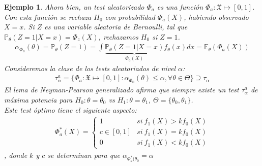 \documentclass[10pt]{article}
\theoremstyle{plain}
\newtheorem{ej}{Ejemplo}
\theoremstyle{definition}
\begin{document}
\begin{ej}
Ahora bien, un test aleatorizado $\Phi_{a}$ es una función $\Phi_{a} : \mathfrak{X} \mapsto [0,1]$. Con esta función se rechaza $H_{0}$ con probabilidad $\Phi_{a}(X)$, habiendo observado $X=x$. Si $Z$ es una variable aleatoria de Bernoulli, tal que $\mathbb{P}_{\theta}(Z=1|X=x)=\Phi_{z}(X)$, rechazamos $H_{0}$ si $Z=1$.
\begin{align*}
\alpha_{\Phi_{a}}(\theta) = \mathbb{P}_{\theta}(Z=1) = \int{\underbrace{\mathbb{P}_{\theta}(Z=1|X=x)}_{\Phi_{a}(X)}f_{\theta}(x) dx} = \mathbb{E}_{\theta}(\Phi_{a}(X))
\end{align*}
Consideremos la clase de los tests aleatoriados de nivel $\alpha$:
\begin{align*}
\tau_{\alpha}^{a} = \{\Phi_{a}: \mathfrak{X}\mapsto [0,1]\colon \alpha_{\Phi_{0}}(\theta)\le \alpha, \forall \theta \in \Theta\} \supseteq \tau_{\alpha}
\end{align*}
El lema de Neyman-Pearson generalizado afirma que siempre existe un test $\tau_{\alpha}^{a}$ de máxima potencia para $H_{0}: \theta = \theta_{0}$ vs $H_{1}: \theta=\theta_{1}$, $\Theta = \{\theta_{0}, \theta_{1}\}$.\\

Este test óptimo tiene el siguiente aspecto:
\begin{align*}
\Phi_{a}^{*}(X) =
\begin{cases} 
      1 & si\ f_{1}(X)>kf_{0}(X) \\
      c \in [0,1]& si\ f_{1}(X)=kf_{0}(X) \\
      0 & si\ f_{1}(X)<kf_{0}(X)
\end{cases}
\end{align*}
, donde $k$ y $c$ se determinan para que $\alpha_{\Phi_{a}^*(\theta_{0}} = \alpha$\\


\end{ej}
\end{document}
